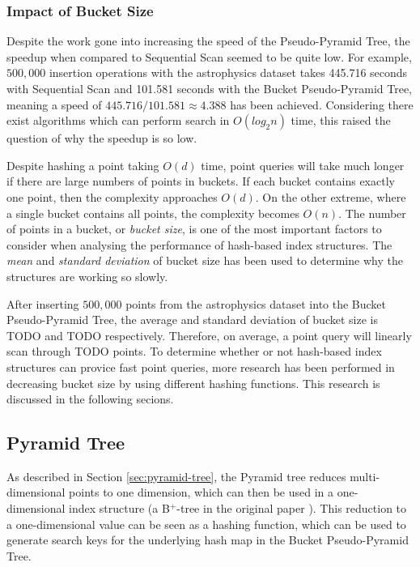 \subsubsection{Impact of Bucket Size}

Despite the work gone into increasing the speed of the Pseudo-Pyramid Tree, the speedup when compared to Sequential Scan seemed to be quite low. For example, $500,000$ insertion operations with the astrophysics dataset takes 445.716 seconds with Sequential Scan and 101.581 seconds with the Bucket Pseudo-Pyramid Tree, meaning a speed of $445.716/101.581 \approx 4.388$ has been achieved. Considering there exist algorithms which can perform search in $O(log_2 n)$ time, this raised the question of why the speedup is so low.

Despite hashing a point taking $O(d)$ time, point queries will take much longer if there are large numbers of points in buckets. If each bucket contains exactly one point, then the complexity approaches $O(d)$. On the other extreme, where a single bucket contains all points, the complexity becomes $O(n)$. The number of points in a bucket, or \textit{bucket size}, is one of the most important factors to consider when analysing the performance of hash-based index structures. The \textit{mean} and \textit{standard deviation} of bucket size has been used to determine why the structures are working so slowly.

After inserting $500,000$ points from the astrophysics dataset into the Bucket Pseudo-Pyramid Tree, the average and standard deviation of bucket size is TODO and TODO respectively. Therefore, on average, a point query will linearly scan through TODO points. To determine whether or not hash-based index structures can provice fast point queries, more research has been performed in decreasing bucket size by using different hashing functions. This research is discussed in the following secions.

\subsection{Pyramid Tree}

As described in Section \ref{sec:pyramid-tree}, the Pyramid tree reduces multi-dimensional points to one dimension, which can then be used in a one-dimensional index structure (a B${}^{+}$-tree in the original paper \cite{pyramid-tree}). This reduction to a one-dimensional value can be seen as a hashing function, which can be used to generate search keys for the underlying hash map in the Bucket Pseudo-Pyramid Tree.

